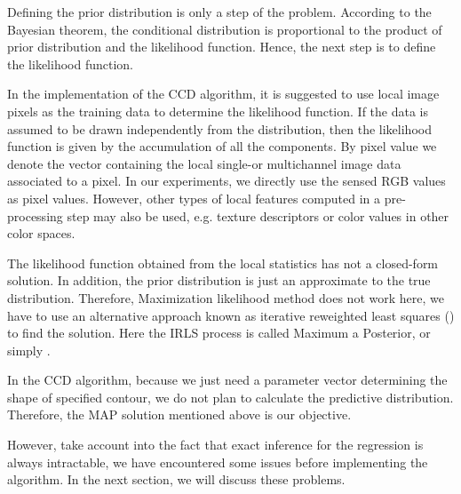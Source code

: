 Defining the prior distribution is only a step of the problem.
According to the Bayesian theorem, the conditional distribution
is proportional to the product of prior distribution and the likelihood
function. Hence, the next step is to define the likelihood function.

In the implementation of the CCD algorithm, it is suggested to use
local image pixels as the training data to determine the
likelihood function. If the data is assumed to be drawn  independently
from the distribution, then the likelihood function is given by the accumulation of all the components.
By pixel value we denote the vector containing the local single-or multichannel
image data associated to a pixel. In our experiments, we directly use the sensed RGB
values as pixel values. However, other types of local features computed in a pre-processing
step may also be used, e.g. texture descriptors or color values in
other color spaces.

The likelihood function obtained from the local statistics has
not a closed-form solution. In addition, the prior distribution is just
an approximate to the true distribution. Therefore, Maximization
likelihood method does not work here, we have to use an alternative
approach known as iterative reweighted least squares () to find
the solution. Here the IRLS process is called Maximum a Posterior, or
simply .

In the CCD algorithm, because we just need a parameter vector determining
the shape of specified contour, we do not plan to calculate the
predictive distribution. Therefore, the MAP solution mentioned above
is our objective.

However, take account into the fact that exact inference for the
regression is always intractable, we have encountered some issues before
implementing the algorithm. In the next section, we will discuss these
problems.


